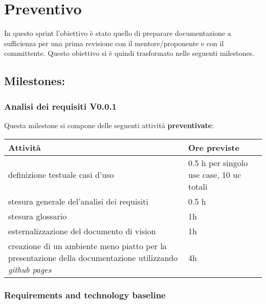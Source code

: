 \section{Preventivo}

In questo sprint l'obiettivo è stato quello di preparare documentazione a sufficienza per una prima revisione con il mentore/proponente e con il committente. Questo obiettivo si è quindi trasformato nelle seguenti milestones.

\subsection{Milestones:}

\subsubsection{Analisi dei requisiti V0.0.1}

Questa milestone si compone delle seguenti attività \textbf{preventivate}:

\begin{center}
    \begin{tabularx}{\textwidth}{X l}
        
        \rowcolor{gray!30} \textbf{Attività} & \textbf{Ore previste}\\
        
        \hline

        definizione testuale casi d'uso  & 0.5 h per singolo use case, 10 uc totali \\
        \rowcolor{gray!10}stesura generale del'analisi dei requisiti & 0.5 h \\
        stesura glossario& 1h\\
        \rowcolor{gray!10}esternalizzazione del documento di vision& 1h\\
        creazione di un ambiente meno piatto per la presentazione della documentazione utilizzando \textit{github pages}& 4h\\
    \end{tabularx}
\end{center}

\subsubsection{Requirements and technology baseline}



